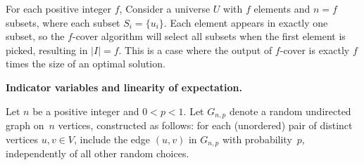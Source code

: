 \documentclass[11pt,addpoints,answers]{exam}
\DeclareMathOperator{\Ex}{\mathbb{E}}
\begin{document}
\begin{questions}
\begin{parts}
    \begin{solution}
     For each positive integer $f$, Consider a universe \( U \) with \( f \) elements and \( n = f \) subsets, where each subset \( S_i = \{u_i\} \). Each element appears in exactly one subset, so the \( f \)-cover algorithm will select all subsets when the first element is picked, resulting in \( |I| = f \). This is a case where the output of \( f \)-cover is exactly \( f \) times the size of an optimal solution.
    \end{solution}
  \end{parts}

  \question \textbf{Indicator variables and linearity of expectation.}

  Let $n$ be a positive integer and $0 < p < 1$.
  Let $G_{n, p}$ denote a random undirected graph on~$n$ vertices, constructed as follows: for each (unordered) pair of distinct vertices $u, v \in V$, include the edge $(u, v)$ in $G_{n, p}$ with probability~$p$, independently of all other random choices.
  
\end{questions}
\end{document}
